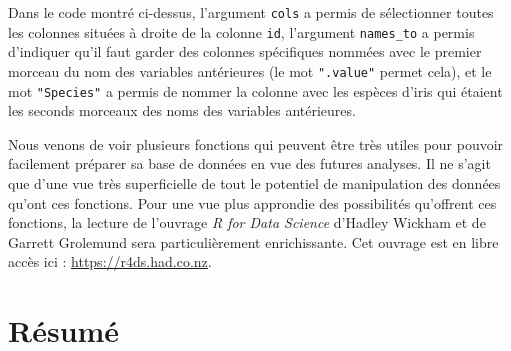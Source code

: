 \documentclass[
  french,
]{book}
\begin{document}
Dans le code montré ci-dessus, l'argument \texttt{cols} a permis de sélectionner toutes les colonnes situées à droite de la colonne \texttt{id}, l'argument \texttt{names\_to} a permis d'indiquer qu'il faut garder des colonnes spécifiques nommées avec le premier morceau du nom des variables antérieures (le mot \texttt{".value"} permet cela), et le mot \texttt{"Species"} a permis de nommer la colonne avec les espèces d'iris qui étaient les seconds morceaux des noms des variables antérieures.

Nous venons de voir plusieurs fonctions qui peuvent être très utiles pour pouvoir facilement préparer sa base de données en vue des futures analyses. Il ne s'agit que d'une vue très superficielle de tout le potentiel de manipulation des données qu'ont ces fonctions. Pour une vue plus approndie des possibilités qu'offrent ces fonctions, la lecture de l'ouvrage \emph{R for Data Science} d'Hadley Wickham et de Garrett Grolemund \autocite*{wickhamDataScience2017} sera particulièrement enrichissante. Cet ouvrage est en libre accès ici : \url{https://r4ds.had.co.nz}.

\hypertarget{ruxe9sumuxe9-1}{%
\section{Résumé}\label{ruxe9sumuxe9-1}}
\end{document}
